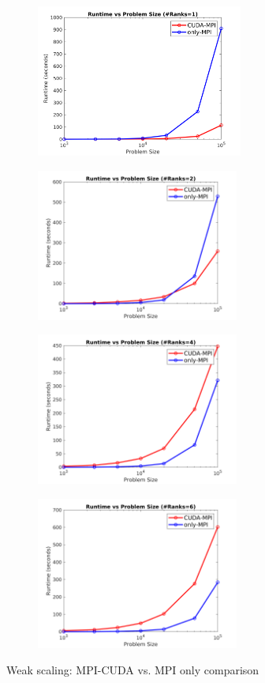 \documentclass[sigplan,screen]{acmart}
\begin{document}
\begin{figure}
	\begin{subfigure}{0.3\textwidth}
		\includegraphics[trim= 10 5 35 10,clip, width=0.95\linewidth, height=5cm]{plots/compare_weak_rank1.png} 
		\caption{}
	\end{subfigure}
	\begin{subfigure}{0.3\textwidth}
		\includegraphics[trim= 10 5 35 10,clip, width=0.95\linewidth, height=5cm]{plots/compare_weak_rank2.png}
		\caption{}
	\end{subfigure}
	\begin{subfigure}{0.3\textwidth}
		\includegraphics[trim= 10 5 35 10,clip, width=0.95\linewidth, height=5cm]{plots/compare_weak_rank4.png} 
		\caption{}
	\end{subfigure}
	\begin{subfigure}{0.3\textwidth}
		\includegraphics[trim= 10 5 35 10,clip, width=0.95\linewidth, height=5cm]{plots/compare_weak_rank6.png}
		\caption{}
	\end{subfigure}
	\caption{Weak scaling: MPI-CUDA vs. MPI only comparison}
	\label{compare_weak}
\end{figure}
\end{document}
